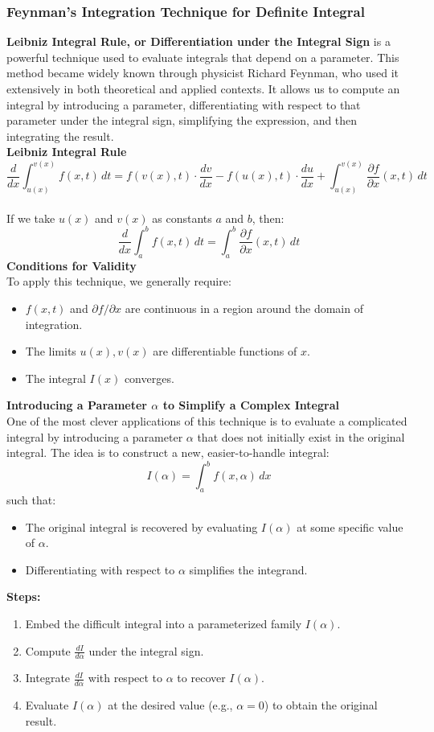 \documentclass[11pt]{article}
\begin{document}
\subsubsection{Feynman's Integration Technique for Definite Integral}
\textbf{Leibniz Integral Rule, or Differentiation under the Integral Sign} is a powerful technique used to evaluate integrals that depend on a parameter. This method became widely known through physicist Richard Feynman, who used it extensively in both theoretical and applied contexts.
It allows us to compute an integral by introducing a parameter, differentiating with respect to that parameter under the integral sign, simplifying the expression, and then integrating the result.\\[.5em]
\textbf{Leibniz Integral Rule}
\[
    \frac{d}{dx} \int_{u(x)}^{v(x)} f(x, t) \, dt
    = f(v(x), t) \cdot \frac{dv}{dx} - f(u(x), t) \cdot \frac{du}{dx} 
    + \int_{u(x)}^{v(x)} \frac{\partial f}{\partial x}(x, t) \, dt
\]\\[.5em]
If we take $u(x)$ and $v(x)$ as constants $a$ and $b$, then:
\[
    \frac{d}{dx} \int_a^b f(x, t) \, dt = \int_a^b \frac{\partial f}{\partial x}(x, t) \, dt
\]
\textbf{Conditions for Validity}\\
To apply this technique, we generally require:
\begin{itemize}
    \item $f(x, t)$ and $\partial f / \partial x$ are continuous in a region around the domain of integration.
    \item The limits $u(x), v(x)$ are differentiable functions of $x$.
    \item The integral $I(x)$ converges.
\end{itemize}
\textbf{Introducing a Parameter $\alpha$ to Simplify a Complex Integral}\\
One of the most clever applications of this technique is to evaluate a complicated integral by introducing a parameter \(\alpha\) that does not initially exist in the original integral. The idea is to construct a new, easier-to-handle integral:
\[
    I(\alpha) = \int_{a}^{b} f(x, \alpha) \, dx
\]
such that:
\begin{itemize}
    \item The original integral is recovered by evaluating $I(\alpha)$ at some specific value of \(\alpha\).
    \item Differentiating with respect to $\alpha$ simplifies the integrand.
\end{itemize}
\textbf{Steps:}
\begin{enumerate}
    \item Embed the difficult integral into a parameterized family $I(\alpha)$.
    \item Compute $\displaystyle\frac{dI}{d\alpha}$ under the integral sign.
    \item Integrate $\displaystyle\frac{dI}{d\alpha}$ with respect to $\alpha$ to recover $I(\alpha)$.
    \item Evaluate $I(\alpha)$ at the desired value (e.g., $\alpha = 0$) to obtain the original result.
\end{enumerate}
\end{document}
